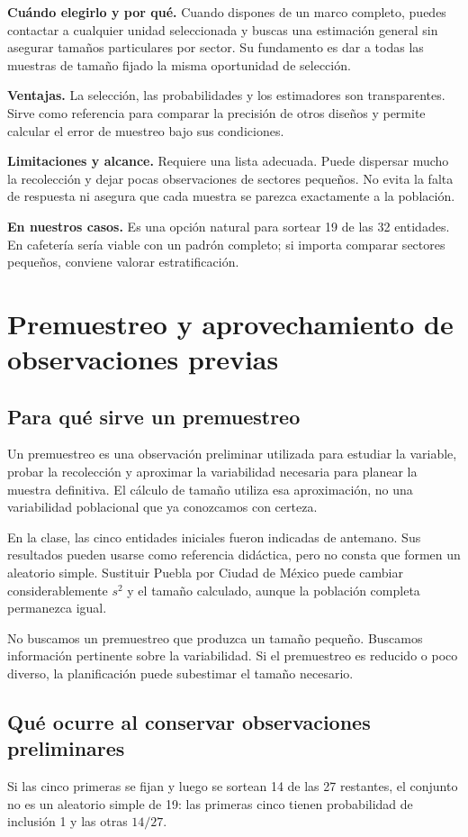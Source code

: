 \documentclass[11pt,letterpaper]{article}
\begin{document}
\textbf{Cuándo elegirlo y por qué.} Cuando dispones de un marco completo, puedes contactar a cualquier unidad seleccionada y buscas una estimación general sin asegurar tamaños particulares por sector. Su fundamento es dar a todas las muestras de tamaño fijado la misma oportunidad de selección.

\textbf{Ventajas.} La selección, las probabilidades y los estimadores son transparentes. Sirve como referencia para comparar la precisión de otros diseños y permite calcular el error de muestreo bajo sus condiciones.

\textbf{Limitaciones y alcance.} Requiere una lista adecuada. Puede dispersar mucho la recolección y dejar pocas observaciones de sectores pequeños. No evita la falta de respuesta ni asegura que cada muestra se parezca exactamente a la población.

\textbf{En nuestros casos.} Es una opción natural para sortear 19 de las 32 entidades. En cafetería sería viable con un padrón completo; si importa comparar sectores pequeños, conviene valorar estratificación.
\clearpage
\section{Premuestreo y aprovechamiento de observaciones previas}

\subsection{Para qué sirve un premuestreo}
Un premuestreo es una observación preliminar utilizada para estudiar la variable, probar la recolección y aproximar la variabilidad necesaria para planear la muestra definitiva. El cálculo de tamaño utiliza esa aproximación, no una variabilidad poblacional que ya conozcamos con certeza.

En la clase, las cinco entidades iniciales fueron indicadas de antemano. Sus resultados pueden usarse como referencia didáctica, pero no consta que formen un aleatorio simple. Sustituir Puebla por Ciudad de México puede cambiar considerablemente $s^2$ y el tamaño calculado, aunque la población completa permanezca igual.

No buscamos un premuestreo que produzca un tamaño pequeño. Buscamos información pertinente sobre la variabilidad. Si el premuestreo es reducido o poco diverso, la planificación puede subestimar el tamaño necesario.
\subsection{Qué ocurre al conservar observaciones preliminares}
Si las cinco primeras se fijan y luego se sortean 14 de las 27 restantes, el conjunto no es un aleatorio simple de 19: las primeras cinco tienen probabilidad de inclusión 1 y las otras $14/27$.
\end{document}
